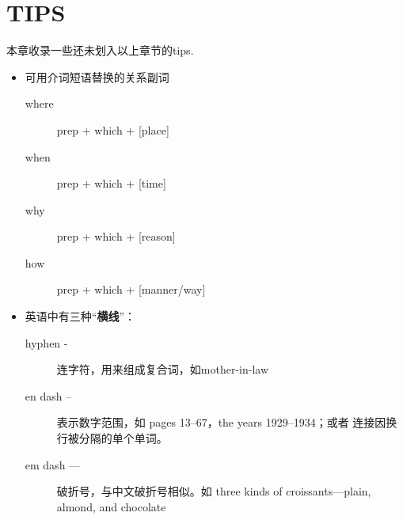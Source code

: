 \chapter{TIPS}

本章收录一些还未划入以上章节的tips.


\begin{itemize}

\item 可用介词短语替换的关系副词
  \begin{description}
  \item[where] prep + which + [place]
  \item[when] prep + which + [time]
  \item[why] prep + which + [reason]
  \item[how] prep + which + [manner/way]
  \end{description}
\item 英语中有三种“\textbf{横线}”：
  \begin{description}
  \item[hyphen -] 连字符，用来组成复合词，如mother-in-law

  \item[en dash --] 表示数字范围，如 pages 13--67，the years 1929--1934；或者
    连接因换行被分隔的单个单词。

  \item[em dash ---] 破折号，与中文破折号相似。如 three kinds of croissants---plain, almond, and chocolate
  \end{description}

\end{itemize}
